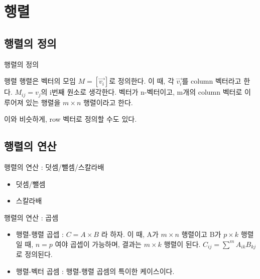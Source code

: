 \documentclass{beamer}
\begin{document}




\section{행렬} 

\subsection{행렬의 정의} 

\begin{frame}{행렬의 정의}
\begin{block}{행렬}  
행렬은 벡터의 모임 $M = [\vec{v_i}]$로 정의한다. 이 때, 각 $\vec{v_i}$를 column 벡터라고 한다. $M_{ij} = v_j$의 i번째 원소로 생각한다. 벡터가 n-벡터이고, m개의 column 벡터로 이루어져 있는 행렬을 $m \times n$ 행렬이라고 한다. 
\end{block}
이와 비슷하게, row 벡터로 정의할 수도 있다. 
\end{frame}

\subsection{행렬의 연산}

\begin{frame}{행렬의 연산 : 덧셈/뺄셈/스칼라배} 
\begin{itemize} 
\item 덧셈/뺄셈 
\item 스칼라배
\end{itemize}
\end{frame}

\begin{frame}{행렬의 연산 : 곱셈} 
\begin{itemize} 
\item 행렬-행렬 곱셉 : $C = A\times B$ 라 하자. 이 때, A가 $m \times n$ 행렬이고 B가 $p \times k$ 행렬일 때, $n=p$ 여야 곱셉이 가능하며, 결과는 $m \times k$ 행렬이 된다. $C_{ij} = \sum^m A_{ik} B_{kj}$ 로 정의된다. 
\item 행렬-벡터 곱셈 : 행렬-행렬 곱셈의 특이한 케이스이다. 
\end{itemize}
\end{frame}
\end{document}

